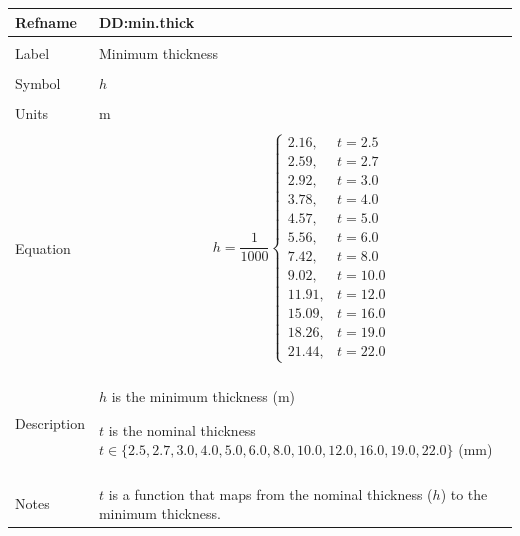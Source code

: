 \documentclass[12pt]{article}
\begin{document}
\noindent \begin{minipage}{\textwidth}
\begin{tabular}{p{} p{}}
\toprule \textbf{Refname} & \textbf{DD:min.thick}
\label{DD:min.thick}
\\ \midrule \\
Label & Minimum thickness
        \\ \midrule \\
        Symbol & $h$
                 \\ \midrule \\
                 Units & m
                         \\ \midrule \\
                         Equation & \begin{displaymath}
                                    h=\frac{1}{1000} \begin{cases}
2.16, & t=2.5\\
2.59, & t=2.7\\
2.92, & t=3.0\\
3.78, & t=4.0\\
4.57, & t=5.0\\
5.56, & t=6.0\\
7.42, & t=8.0\\
9.02, & t=10.0\\
11.91, & t=12.0\\
15.09, & t=16.0\\
18.26, & t=19.0\\
21.44, & t=22.0
\end{cases}
                                    \end{displaymath}
                                    \\ \midrule \\
                                    Description & \begin{symbDescription}
                                                  \item{$h$ is the minimum thickness (m)}
                                                  \item{$t$ is the nominal thickness $t\in{}\{2.5,2.7,3.0,4.0,5.0,6.0,8.0,10.0,12.0,16.0,19.0,22.0\}$ (mm)}
                                                  \end{symbDescription}
                                                  \\ \midrule \\
                                                  Notes & $t$ is a function that maps from the nominal thickness ($h$) to the minimum thickness.

\end{tabular}
\end{minipage}
\end{document}

